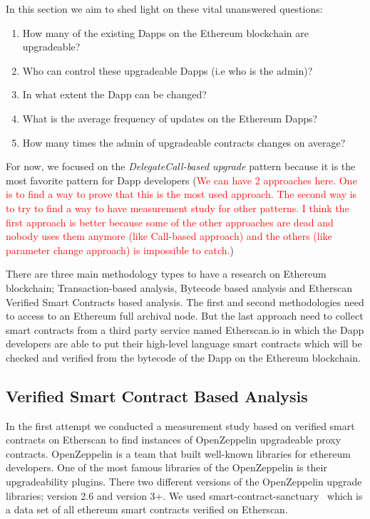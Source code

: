  In this section we aim to shed light on these vital unanswered questions: 
 \begin{enumerate}
  \item How many of the existing Dapps on the Ethereum blockchain are upgradeable?
  \item Who can control these upgradeable Dapps (i.e who is the admin)? 
  \item In what extent the Dapp can be changed?
  \item What is the average frequency of updates on the Ethereum Dapps?
  \item How many times the admin of upgradeable contracts changes on average?
\end{enumerate}
 
For now, we focused on the \textit{DelegateCall-based upgrade} pattern because it is the most favorite pattern for Dapp developers (\textcolor{red}{We can have 2 approaches here. One is to find a way to prove that this is the most used approach. The second way is to try to find a way to have measurement study for other patterns. I think the first approach is better because some of the other approaches are dead and nobody uses them anymore (like Call-based approach) and the others (like parameter change approach) is impossible to catch.})

There are three main methodology types to have a research on Ethereum blockchain; Transaction-based analysis, Bytecode based analysis and Etherscan Verified Smart Contracts based analysis. The first and second methodologies need to access to an Ethereum full archival node. But the last approach need to collect smart contracts from a third party service named Etherscan.io in which the Dapp developers are able to put their high-level language smart contracts which will be checked and verified from the bytecode of the Dapp on the Ethereum blockchain.

\subsection{Verified Smart Contract Based Analysis}
In the first attempt we conducted a measurement study based on verified smart contracts on Etherscan to find instances of OpenZeppelin upgradeable proxy contracts. OpenZeppelin is a team that built well-known libraries for ethereum developers. One of the most famous libraries of the OpenZeppelin is their upgradeability plugins. There two different versions of the OpenZeppelin upgrade libraries; version 2.6 and version 3+. 
We used smart-contract-sanctuary~\cite{smart_contract_sanctuary} which is a data set of all ethereum smart contracts verified on Etherscan. 


